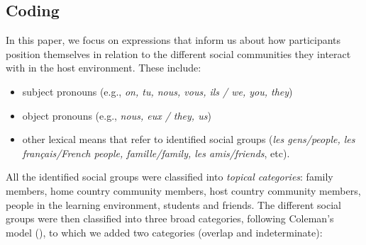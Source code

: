 \documentclass[output=paper]{langscibook}
\begin{document}
\subsection{Coding}\label{sec:saddour:2.3}

In this paper, we focus on expressions that inform us about how participants position themselves in relation to the different social communities they interact with in the host environment. These include:

\begin{itemize}
\item subject pronouns (e.g., \textit{on, tu, nous, vous, ils / we, you, they})
\item object pronouns (e.g., \textit{nous, eux / they, us})
\item other lexical means that refer to identified social groups (\textit{les gens/people, les français/French people, famille/family, les amis/friends}, etc).
\end{itemize}

All the identified social groups were classified into \textit{topical categories}: family members, home country community members, host country community members, people in the learning environment, students and friends. The different social groups were then classified into three broad categories, following Coleman’s model (\citeyear{Coleman2013, Coleman2015}), to which we added two categories (overlap and indeterminate):
\end{document}

